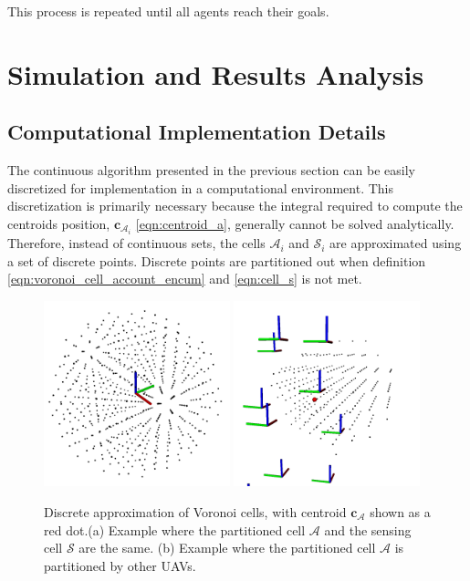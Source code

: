        This process is repeated until all agents reach their goals.


\section{Simulation and Results Analysis}

    \subsection{Computational Implementation Details}
        The continuous algorithm presented in the previous section can be easily discretized for implementation in a computational environment.
        This discretization is primarily necessary because the integral required to compute the centroids position, $\mathbf{c}_{\mathcal{A}_i}$ \eqref{eqn:centroid_a}, generally cannot be solved analytically.
        Therefore, instead of continuous sets, the cells $\mathcal{A}_i$ and  $\mathcal{S}_i$ are approximated using a set of discrete points.
        Discrete points are partitioned out when definition \eqref{eqn:voronoi_cell_account_encum} and \eqref{eqn:cell_s} is not met.
        \begin{figure}[htbp]
            \centering
            \includegraphics[width=0.48\textwidth, height=0.48\textwidth]{./fig/rviz/cs_equal_ca.png}
            \includegraphics[width=0.48\textwidth, height=0.48\textwidth]{./fig/rviz/ca_partitioned.png}
            \caption{
                Discrete approximation of Voronoi cells, with centroid $\mathbf{c}_{\mathcal{A}}$ shown as a red dot.(a) Example where the partitioned cell $\mathcal{A}$ and the sensing cell $\mathcal{S}$ are the same. (b) Example where the partitioned cell $\mathcal{A}$ is partitioned by other \ac{UAV}s.
            }
            \label{fig:rviz_cells}
        \end{figure}
        
